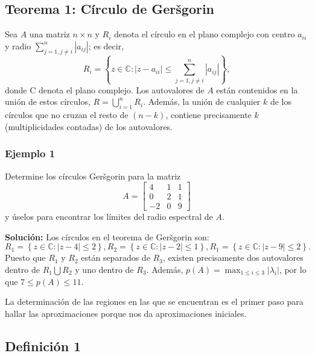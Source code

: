 \documentclass{report}
\numberwithin{subsection}{section} %
\begin{document}
\subsection{\textnormal{Teorema 1: Círculo de Geršgorin}}

Sea $A$ una matriz $n\times n$ y $R_i$ denota el círculo en el plano complejo con centro $a_{ii}$ y radio $\sum_{j=1,j\neq i}^{n}\left| a_{ij} \right|$; es decir,
\begin{equation}
R_{i} = \left\{ z \in \mathbb{C} : \left| z - a_{ii} \right| \le \sum_{j=1,j\neq i}^{n}\left| a_{ij} \right| \right\},
\end{equation}
donde C denota el plano complejo. Los autovalores de $A$ están contenidos en la unión de estos círculos, $R=\bigcup_{i=1}^{n}R_{i}$. Además, la unión de cualquier $k$ de los círculos que no cruzan el resto de $\left( n - k \right)$, contiene precisamente $k$ (multiplicidades contadas) de los autovalores.

\subsubsection*{Ejemplo 1}

Determine los círculos Geršgorin para la matriz
\begin{equation*}
A =\begin{bmatrix}
4 & 1 & 1 \\
0 & 2 & 1 \\
-2 & 0 & 9
\end{bmatrix}
\end{equation*}
y úselos para encontrar los límites del radio espectral de $A$.

\textbf{Solución:} Los círculos en el teorema de Geršgorin son:
\begin{equation*}
R_{1} = \left\{ z \in \mathbb{C} : \left| z - 4 \right| \le 2 \right\}, R_{2} = \left\{ z \in \mathbb{C} : \left| z - 2 \right| \le 1 \right\}, R_{1} = \left\{ z \in \mathbb{C} : \left| z - 9 \right| \le 2 \right\}.
\end{equation*}
Puesto que $R_{1}$ y $R_{2}$ están separados de $R_{3}$, existen precisamente dos autovalores dentro de $R_{1}\bigcup R_{2}$ y uno dentro de $R_{3}$. Además, $p(A)= \max_{1\le i\le 3} \left| \lambda_{i} \right|$, por lo que $7 \le p(A) \le 11$.

La determinación de las regiones en las que se encuentran es el primer paso para hallar las aproximaciones porque nos da aproximaciones iniciales.

\subsection{\textnormal{Definición 1}}
\end{document}
